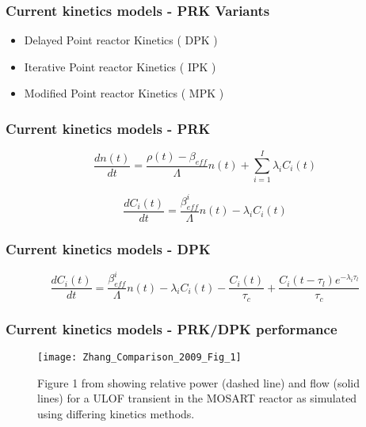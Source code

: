 \documentclass{beamer}
\begin{document}
\begin{frame}
\frametitle{Current kinetics models - PRK Variants}

    \begin{itemize}
        \item Delayed Point reactor Kinetics ( DPK )
        \item Iterative Point reactor Kinetics ( IPK )
        \item Modified Point reactor Kinetics ( MPK )
    \end{itemize}

\end{frame}

\begin{frame}
\frametitle{Current kinetics models - PRK}
\begin{equation}
    \label{eq:prk}
    \frac{dn(t)}{dt} = \frac{\rho(t) - \beta_{eff}}{\Lambda} n(t) +
     \sum_{i = 1}^{I} \lambda_{i} C_{i}(t)
\end{equation}

\begin{equation}
    \label{eq:prk_dnp}
    \frac{dC_{i}(t)}{dt} = \frac{\beta_{eff}^{i}}{\Lambda} n(t) -
        \lambda_{i} C_{i}(t)
\end{equation}

\end{frame}

\begin{frame}
\frametitle{Current kinetics models - DPK}
\begin{equation}
    \label{eq:dpk_dnp}
    \frac{dC_{i}(t)}{dt} = \frac{\beta_{eff}^{i}}{\Lambda} n(t) -
        \lambda_{i} C_{i}(t) - \frac{C_{i}(t)}{\tau_{c}} +
        \frac{C_{i}(t - \tau_{l}) e^{-\lambda_{i} \tau_{l}}}{\tau_{c}}
\end{equation}

\end{frame}

\begin{frame}
\frametitle{Current kinetics models - PRK/DPK performance}

    \begin{figure}
        \centering
        \texttt{[image: Zhang\_Comparison\_2009\_Fig\_1]}
        \caption{Figure 1 from \cite{zhang_comparison_2009} showing relative power (dashed line) and flow (solid lines) for a 
   ULOF transient in the MOSART reactor as simulated using differing kinetics methods.}
        \label{fig:zhang_comparison_ulof}
    \end{figure}

\end{frame}
\end{document}
